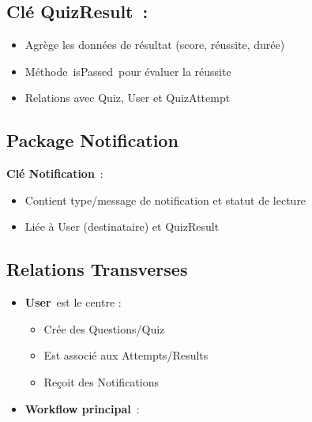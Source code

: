 \documentclass[12pt,a4paper,twoside]{report}
\begin{document}
\hypertarget{cluxe9-quizresult}{%
\subsection{Clé QuizResult~:}\label{cluxe9-quizresult}}

\begin{itemize}
\item
  Agrège les données de résultat (score, réussite, durée)
\item
  Méthode~isPassed~pour évaluer la réussite
\item
  Relations avec Quiz, User et QuizAttempt
\end{itemize}

\hypertarget{package-notification}{%
\subsection{\texorpdfstring{ Package
Notification}{ Package Notification}}\label{package-notification}}

\textbf{Clé Notification}~:

\begin{itemize}
\item
  Contient type/message de notification et statut de lecture
\item
  Liée à User (destinataire) et QuizResult
\end{itemize}

\hypertarget{relations-transverses}{%
\subsection{Relations Transverses}\label{relations-transverses}}

\begin{itemize}
\item
  \textbf{User}~est le centre :

  \begin{itemize}
  \item
    Crée des Questions/Quiz
  \item
    Est associé aux Attempts/Results
  \item
    Reçoit des Notifications
  \end{itemize}
\end{itemize}

\begin{itemize}
\item
  \textbf{Workflow principal}~:
\end{itemize}
\end{document}
